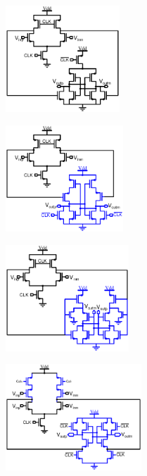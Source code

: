 \begin{figure}[htp]
	\centering
	\begin{subfigure}[b]{0.32\textwidth}
        \includegraphics[height=4cm]{Chapter7/Figs/dbl_tail_schinkel.ps}
        \label{fig:dbl_tail_shinkel}
    \end{subfigure}
    \begin{subfigure}[b]{0.32\textwidth}
        \includegraphics[height=4cm]{Chapter7/Figs/dbl_tail_elzakker.ps}
        \label{fig:dbl_tail_elzakker}
    \end{subfigure}
    \begin{subfigure}[b]{0.32\textwidth}
        \includegraphics[height=4cm]{Chapter7/Figs/dbl_tail_miyahara.ps}
        \label{fig:dbl_tail_miyahara}
    \end{subfigure}
    \begin{subfigure}[b]{0.48\textwidth}
        \centering
        \includegraphics[height=4cm]{Chapter7/Figs/dbl_tail_chan.ps}

\end{subfigure}
\end{figure}

